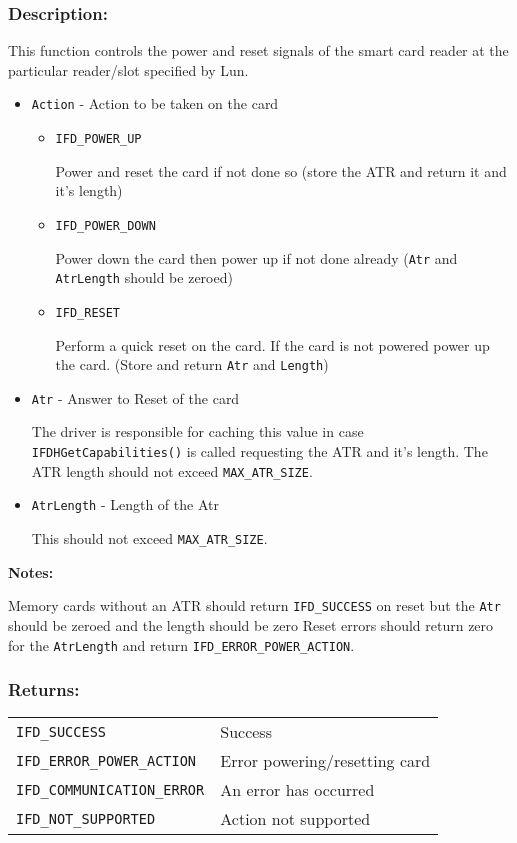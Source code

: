 \documentclass[a4paper,12pt]{article}
\newcommand{\desc}{\subsubsection{Description:}}
\newcommand{\returns}{\subsubsection{Returns:}}
\begin{document}
\desc

This function controls the power and reset signals of the smart card
reader at the particular reader/slot specified by Lun.

\begin{itemize}
\item \texttt{Action} - Action to be taken on the card

\begin{itemize}
\item \texttt{IFD\_POWER\_UP}

Power and reset the card if not done so (store the ATR and return it and
it's length)

\item \texttt{IFD\_POWER\_DOWN}

Power down the card then power up if not done already (\texttt{Atr} and
\texttt{AtrLength} should be zeroed)

\item \texttt{IFD\_RESET}

Perform a quick reset on the card. If the card is not powered power up
the card. (Store and return \texttt{Atr} and \texttt{Length})

\end{itemize}

\item \texttt{Atr} - Answer to Reset of the card

The driver is responsible for caching this value in case
\texttt{IFDHGetCapabilities()} is called requesting the ATR and it's
length. The ATR length should not exceed \texttt{MAX\_ATR\_SIZE}.

\item \texttt{AtrLength} - Length of the Atr

This should not exceed \texttt{MAX\_ATR\_SIZE}.

\end{itemize}

\textbf{Notes:}

Memory cards without an ATR should return \texttt{IFD\_SUCCESS} on reset
but the \texttt{Atr} should be zeroed and the length should be zero
Reset errors should return zero for the \texttt{AtrLength} and return
\texttt{IFD\_ERROR\_POWER\_ACTION}.

\returns

\begin{tabular}{ll}
\texttt{IFD\_SUCCESS} & Success\\
\texttt{IFD\_ERROR\_POWER\_ACTION} & Error powering/resetting card\\
\texttt{IFD\_COMMUNICATION\_ERROR} & An error has occurred\\
\texttt{IFD\_NOT\_SUPPORTED} & Action not supported\\
\end{tabular}
\end{document}
